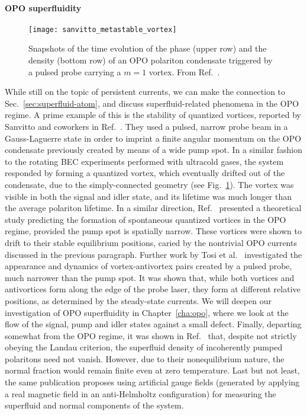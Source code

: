 \paragraph{OPO superfluidity}
%
\begin{figure}[H]\centering
  \texttt{[image: sanvitto\_metastable\_vortex]}
  \caption{
    Snapshots of the time evolution of the phase (upper row) and the
    density (bottom row) of an OPO polariton condensate triggered by a
    pulsed probe carrying a $m=1$ vortex. From Ref.~\cite{Sanvitto_2010}.
  }\label{fig:opo-metastable-vortex}
\end{figure}
% 

While still on the topic of persistent currents, we can make the
connection to Sec.~\ref{sec:superfluid-atom}, and discuss
superfluid-related phenomena in the OPO regime. A prime example of
this is the stability of quantized vortices, reported by Sanvitto and
coworkers in Ref.~\cite{Sanvitto_2010}. They used a pulsed, narrow
probe beam in a Gauss-Laguerre state in order to imprint a finite
angular momentum on the OPO condensate previously created by means of
a wide pump spot. In a similar fashion to the rotating BEC experiments
performed with ultracold gases, the system responded by forming a
quantized vortex, which eventually drifted out of the condensate, due
to the simply-connected geometry (see
Fig.~\ref{fig:opo-metastable-vortex}). The vortex was visible in both
the signal and idler state, and its lifetime was much longer than the
average polariton lifetime.
In a similar direction,
Ref.~\cite{Marchetti_2010} presented a theoretical study predicting
the formation of spontaneous quantized vortices in the OPO regime,
provided the pump spot is spatially narrow. These vortices were shown
to drift to their stable equilibrium positions, caried by the
nontrivial OPO currents discussed in the previous paragraph. Further
work by Tosi et al.~\cite{Tosi_2011} investigated the appearance and
dynamics of vortex-antivortex pairs created by a pulsed probe, much
narrower than the pump spot. It was shown that, while both vortices
and antivortices form along the edge of the probe laser, they form at
different relative positions, as determined by the steady-state
currents. We will deepen our investigation of OPO superfluidity in
Chapter~\ref{cha:opo}, where we look at the flow of the signal, pump
and idler states against a small defect.
%
Finally, departing somewhat from the OPO regime, it was
shown in Ref.~\cite{Keeling_2011_prl} that, despite not strictly
obeying the Landau criterion, the superfluid density of incoherently
pumped polaritons need not vanish. However, due to their
nonequilibrium nature, the normal fraction would remain finite even at
zero temperature. Last but not least, the same publication proposes
using artificial gauge fields (generated by applying a real magnetic
field in an anti-Helmholtz configuration) for measuring the superfluid
and normal components of the system.


